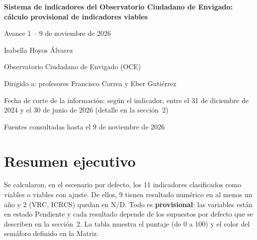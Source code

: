 \documentclass[11pt,letterpaper]{article}
\begin{document}
\hypersetup{pageanchor=false}
\begin{titlepage}
\centering
\vspace*{3cm}
{\LARGE\bfseries Sistema de indicadores del Observatorio Ciudadano de Envigado: cálculo provisional de indicadores viables\par}
\vspace{1.5cm}
{\large Avance 1 -- 9 de noviembre de 2026\par}
\vspace{2cm}
{\large Isabella Hoyos Álvarez\par}
\vspace{0.5cm}
{\large Observatorio Ciudadano de Envigado (OCE)\par}
\vspace{2cm}
{\large Dirigido a: profesores Francisco Correa y Eber Gutiérrez\par}
\vfill
{\large Fecha de corte de la información: según el indicador, entre el 31 de diciembre de 2024 y el 30 de junio de 2026 (detalle en la sección~2)\par}
\vspace{0.3cm}
{\large Fuentes consultadas hasta el 9 de noviembre de 2026\par}
\end{titlepage}
\hypersetup{pageanchor=true}


\begin{center}\end{center}

\tableofcontents
\clearpage

\section{Resumen ejecutivo}

Se calcularon, en el escenario por defecto, los 11 indicadores clasificados como viables o viables con ajuste. De ellos, 9 tienen resultado numérico en al menos un año y 2 (VRC, ICRCS) quedan en N/D. Todo es \textbf{provisional}: las variables están en estado Pendiente y cada resultado depende de los supuestos por defecto que se describen en la sección~2. La tabla muestra el puntaje (de 0 a 100) y el color del semáforo definido en la Matriz.
\end{document}
